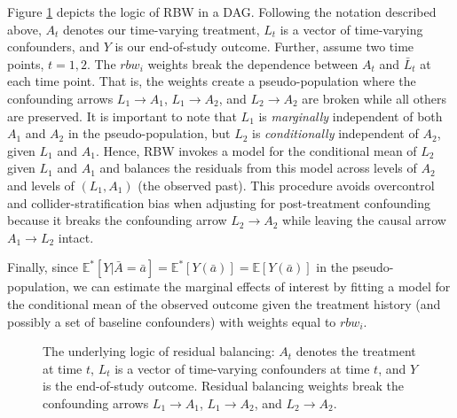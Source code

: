 Figure \ref{fig:1} depicts the logic of RBW in a DAG. Following the
notation described above, \(A_{t}\) denotes our time-varying treatment,
\(L_{t}\) is a vector of time-varying confounders, and \(Y\) is our
end-of-study outcome. Further, assume two time points, \(t=1,2\). The
\(rbw_{i}\) weights break the dependence between \(A_{t}\) and
\(\bar{L}_{t}\) at each time point. That is, the weights create a
pseudo-population where the confounding arrows
\(L_{1}\rightarrow A_{1}\), \(L_{1}\rightarrow A_{2}\), and
\(L_{2}\rightarrow A_{2}\) are broken while all others are preserved. It
is important to note that \(L_{1}\) is \emph{marginally} independent of
both \(A_{1}\) and \(A_{2}\) in the pseudo-population, but \(L_{2}\) is
\emph{conditionally} independent of \(A_{2}\), given \(L_{1}\) and
\(A_{1}\). Hence, RBW invokes a model for the conditional mean of
\(L_{2}\) given \(L_{1}\) and \(A_{1}\) and balances the residuals from
this model across levels of \(A_{2}\) and levels of \((L_{1}, A_{1})\)
(the observed past). This procedure avoids overcontrol and
collider-stratification bias when adjusting for post-treatment
confounding because it breaks the confounding arrow
\(L_{2}\rightarrow A_{2}\) while leaving the causal arrow
\(A_{1}\rightarrow L_{2}\) intact.

Finally, since
\(\mathbb{E}^{*}[Y|\bar{A}=\bar{a}]=\mathbb{E}^{*}[Y(\bar{a})]=\mathbb{E}[Y(\bar{a})]\)
in the pseudo-population, we can estimate the marginal effects of
interest by fitting a model for the conditional mean of the observed
outcome given the treatment history (and possibly a set of baseline
confounders) with weights equal to \(rbw_{i}\).

\begin{figure} [ht]
\begin{center}
\end{center}
\caption{The underlying logic of residual balancing: \(A_{t}\) denotes the
treatment at time \(t\), \(L_{t}\) is a vector of time-varying confounders
at time \(t\), and \(Y\) is the end-of-study outcome. Residual balancing weights break 
the confounding arrows \(L_{1}\rightarrow A_{1}\), \(L_{1}\rightarrow A_{2}\), and
\(L_{2}\rightarrow A_{2}\).}
\label{fig:1}
\end{figure}

